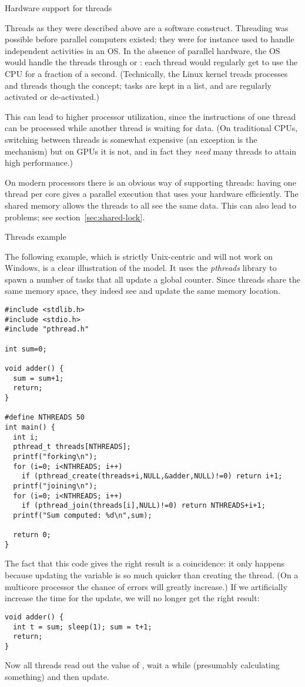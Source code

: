  {Hardware support for threads}

Threads as they were described above are a software
construct. Threading was possible before parallel computers existed;
they were for instance used to handle independent activities in an
\ac{OS}.
In the absence of parallel hardware, the \ac{OS} would handle
the threads through  or : each thread would regularly get to use the \ac{CPU} for a
fraction of a second. (Technically, the Linux kernel treads processes
and threads though the  concept; tasks are kept in
a list, and are regularly activated or de-activated.)

This can lead to higher processor utilization,
since the instructions of one thread can be processed
while another thread is waiting for data.
(On traditional CPUs,
switching between threads is somewhat expensive (an exception is the
 mechanism) but on \acp{GPU} it is not, and
in fact they \emph{need} many threads to attain high performance.)

On modern  processors there is an obvious way of
supporting threads: having one thread per core gives a parallel
execution that uses your hardware efficiently. The shared memory allows the threads to all
see the same data. This can also lead to problems; see
section~\ref{sec:shared-lock}.

 {Threads example}
\label{sec:thread-example}

The following example,
which is strictly Unix-centric and will not work on Windows,
is a clear illustration of the  model.
It uses the \emph{pthreads} library to spawn
a number of tasks that all update a global counter. Since threads
share the same memory space, they indeed see and update the same
memory location.
\begin{verbatim}
#include <stdlib.h>
#include <stdio.h>
#include "pthread.h"

int sum=0;

void adder() {
  sum = sum+1;
  return;
}

#define NTHREADS 50
int main() {
  int i;
  pthread_t threads[NTHREADS];
  printf("forking\n");
  for (i=0; i<NTHREADS; i++)
    if (pthread_create(threads+i,NULL,&adder,NULL)!=0) return i+1;
  printf("joining\n");
  for (i=0; i<NTHREADS; i++)
    if (pthread_join(threads[i],NULL)!=0) return NTHREADS+i+1;
  printf("Sum computed: %d\n",sum);

  return 0;
}
\end{verbatim}
The fact that this code gives the right result is a
coincidence: it
only happens because updating the variable is so much quicker than
creating the thread. (On a multicore processor the chance of errors
will greatly increase.) If we artificially increase the time for the
update, we will no longer get the right result:
\begin{verbatim}
void adder() {
  int t = sum; sleep(1); sum = t+1;
  return;
}
\end{verbatim}
Now all threads read out the value of , wait a while
(presumably calculating something) and then update.

